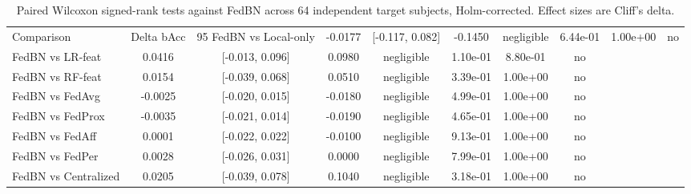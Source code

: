 \begin{table}
\caption{Paired Wilcoxon signed-rank tests against FedBN across 64 independent target subjects, Holm-corrected. Effect sizes are Cliff's delta.}
\label{tab:sig}
\begin{tabular}{lccccccc}
\toprule
Comparison & Delta bAcc & 95%
\midrule
FedBN vs Local-only & -0.0177 & [-0.117, 0.082] & -0.1450 & negligible & 6.44e-01 & 1.00e+00 & no \\
FedBN vs LR-feat & 0.0416 & [-0.013, 0.096] & 0.0980 & negligible & 1.10e-01 & 8.80e-01 & no \\
FedBN vs RF-feat & 0.0154 & [-0.039, 0.068] & 0.0510 & negligible & 3.39e-01 & 1.00e+00 & no \\
FedBN vs FedAvg & -0.0025 & [-0.020, 0.015] & -0.0180 & negligible & 4.99e-01 & 1.00e+00 & no \\
FedBN vs FedProx & -0.0035 & [-0.021, 0.014] & -0.0190 & negligible & 4.65e-01 & 1.00e+00 & no \\
FedBN vs FedAff & 0.0001 & [-0.022, 0.022] & -0.0100 & negligible & 9.13e-01 & 1.00e+00 & no \\
FedBN vs FedPer & 0.0028 & [-0.026, 0.031] & 0.0000 & negligible & 7.99e-01 & 1.00e+00 & no \\
FedBN vs Centralized & 0.0205 & [-0.039, 0.078] & 0.1040 & negligible & 3.18e-01 & 1.00e+00 & no \\
\bottomrule
\end{tabular}
\end{table}
